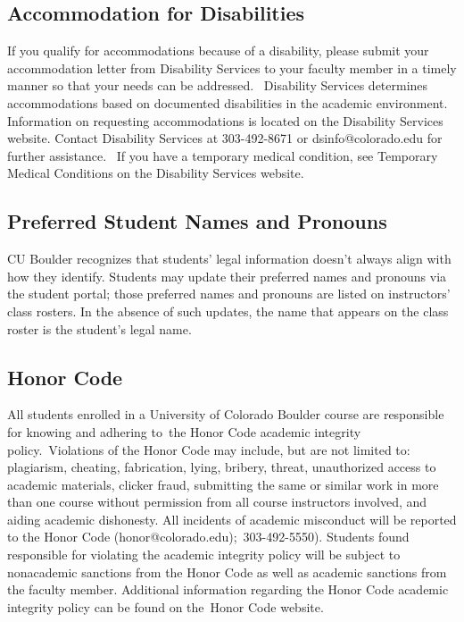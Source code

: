 \documentclass[9pt]{article}
\begin{document}
{\subsection*{Accommodation for Disabilities}
If you qualify for accommodations because of a disability, please submit your accommodation letter from Disability Services to your faculty member in a timely manner so that your needs can be addressed.  Disability Services determines accommodations based on documented disabilities in the academic environment.  Information on requesting accommodations is located on the Disability Services website. Contact Disability Services at 303-492-8671 or dsinfo@colorado.edu for further assistance.  If you have a temporary medical condition, see Temporary Medical Conditions on the Disability Services website.

\subsection*{Preferred Student Names and Pronouns}

CU Boulder recognizes that students' legal information doesn't always align with how they identify. Students may update their preferred names and pronouns via the student portal; those preferred names and pronouns are listed on instructors' class rosters. In the absence of such updates, the name that appears on the class roster is the student's legal name.

\subsection*{Honor Code}
All students enrolled in a University of Colorado Boulder course are responsible for knowing and adhering to the Honor Code academic integrity policy. Violations of the Honor Code may include, but are not limited to: plagiarism, cheating, fabrication, lying, bribery, threat, unauthorized access to academic materials, clicker fraud, submitting the same or similar work in more than one course without permission from all course instructors involved, and aiding academic dishonesty. All incidents of academic misconduct will be reported to the Honor Code (honor@colorado.edu); 303-492-5550). Students found responsible for violating the academic integrity policy will be subject to nonacademic sanctions from the Honor Code as well as academic sanctions from the faculty member. Additional information regarding the Honor Code academic integrity policy can be found on the Honor Code website.

}
\end{document}
